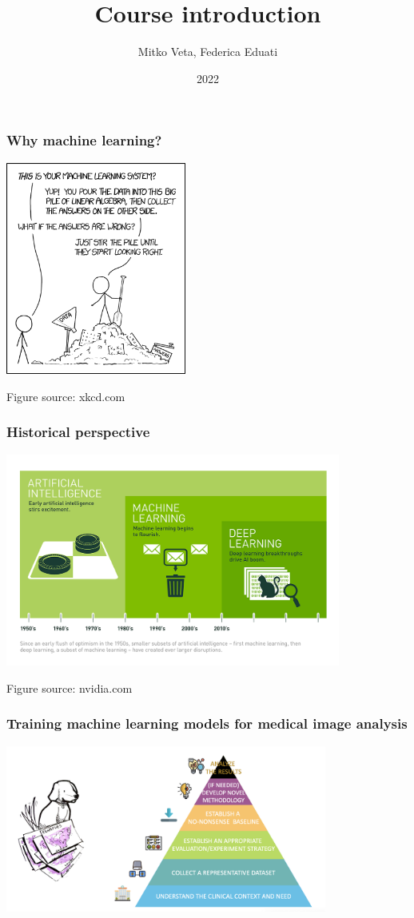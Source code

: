 \documentclass[notes]{beamer}          %
\title{Course introduction}
\author{Mitko Veta, Federica Eduati}
\institute{Eindhoven University of Technology

Department of Biomedical Engineering}
\date{2022}
\begin{document}
 
\frame{\titlepage}

\begin{frame}
\frametitle{Why machine learning?}
\begin{center}
\includegraphics[height=7cm]{../figures/intro/machine_learning.png}
\end{center}
{\tiny Figure source: xkcd.com}
\end{frame}

\begin{frame}
\frametitle{Historical perspective}
\begin{center}
\includegraphics[height=7cm]{../figures/intro/deep_learning.png}
\end{center}
{\tiny Figure source: nvidia.com}
\end{frame}


\begin{frame}
\frametitle{Training machine learning models for medical image analysis}
\begin{center}
\includegraphics[height=5.5cm]{../figures/intro/pyramid.png}
\end{center}
\end{frame}
\end{document}
